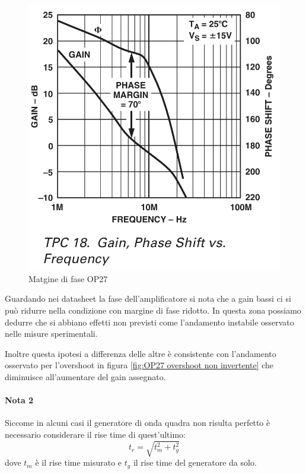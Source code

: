 

\begin{figure}[!h]
    \centering
    \includegraphics[width=0.3\linewidth]{analog/assets/OP27/OP27_Phase_Margin.png}
    \caption{Matgine di fase OP27}
\end{figure}

\begin{flushleft}
    

\colorbox{notebox}{
\begin{minipage}[]{\textwidth}
Guardando nei datasheet la fase dell'amplificatore si nota che a gain bassi ci si può ridurre nella condizione con margine di fase ridotto. In questa zona possiamo dedurre che si abbiano effetti non previsti come l'andamento instabile osservato nelle misure sperimentali.

Inoltre questa ipotesi a differenza delle altre è consistente con l'andamento osservato per l'overshoot in figura \ref{fig:OP27 overshoot non invertente} che diminuisce all'aumentare del gain assegnato.
\end{minipage}
}
\end{flushleft}
\paragraph{Nota 2}
Siccome in alcuni casi il generatore di onda quadra non risulta perfetto è necessario considerare il rise time di quest'ultimo:
\[t_r = \sqrt{t_m^2 + t_g^2}\]
dove $t_m$ è il rise time misurato e $t_g$ il rise time del generatore da solo.


